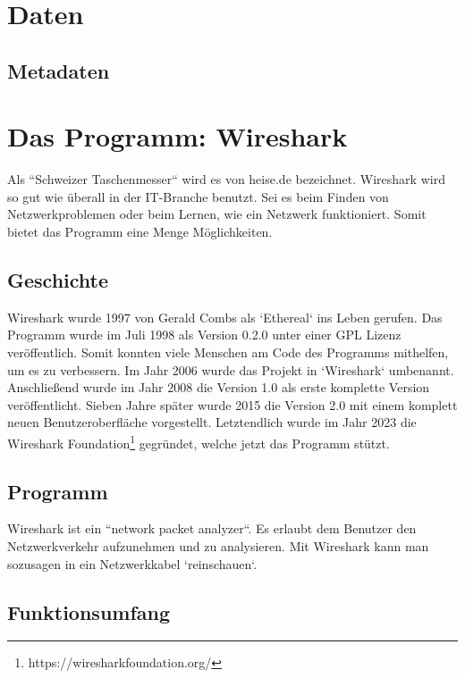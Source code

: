 \documentclass[12pt]{article}
\begin{document}
\section{Daten}
\subsection{Metadaten}



\section{Das Programm: Wireshark}

Als ``Schweizer Taschenmesser``\cite{schweizer-taschenmesser} wird es von heise.de bezeichnet. Wireshark wird so gut wie überall in der IT-Branche benutzt. Sei es beim Finden von Netzwerkproblemen oder beim Lernen, wie ein Netzwerk funktioniert. Somit bietet das Programm eine Menge Möglichkeiten.

\subsection{Geschichte}
Wireshark wurde 1997 von Gerald Combs als `Ethereal` ins Leben gerufen. Das Programm wurde im Juli 1998 als Version 0.2.0 unter einer GPL Lizenz\cite{gnu-gpl} veröffentlich.\cite{gnu-wireshark} Somit konnten viele Menschen am Code des Programms mithelfen, um es zu verbessern. Im Jahr 2006 wurde das Projekt in `Wireshark` umbenannt. Anschließend wurde  im Jahr 2008 die Version 1.0 als erste komplette Version veröffentlicht. Sieben Jahre später wurde 2015 die Version 2.0 mit einem komplett neuen Benutzeroberfläche vorgestellt. Letztendlich wurde im Jahr 2023 die Wireshark Foundation\footnote{https://wiresharkfoundation.org/} gegründet, welche jetzt das Programm stützt. \cite{wireshark-history}

\subsection{Programm}
Wireshark ist ein ``network packet analyzer``\cite{what-is-wireshark}. Es erlaubt dem Benutzer den Netzwerkverkehr aufzunehmen und zu analysieren. Mit Wireshark kann man sozusagen in ein Netzwerkkabel `reinschauen`.

\subsection{Funktionsumfang}
\end{document}
